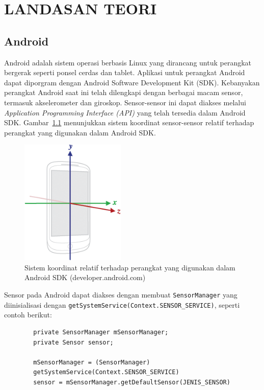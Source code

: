 \chapter{LANDASAN TEORI}

\section{Android}
Android adalah sistem operasi berbasis Linux yang dirancang untuk perangkat bergerak seperti ponsel cerdas dan tablet. Aplikasi untuk perangkat Android dapat diporgram dengan Android Software Development Kit (SDK). Kebanyakan perangkat Android saat ini telah dilengkapi dengan berbagai macam sensor, termasuk akselerometer dan giroskop. Sensor-sensor ini dapat diakses melalui \textit{Application Programming Interface (API)} yang telah tersedia dalam Android SDK\@. Gambar~\ref{gambar:koordinat-sensor-android} menunjukkan sistem koordinat sensor-sensor relatif terhadap perangkat yang digunakan dalam Android SDK\@.

\begin{figure}[h!]
    \centering
    \includegraphics[width=5cm]{gambar/landasan-teori/axis_device.png}
    \caption{Sistem koordinat relatif terhadap perangkat yang digunakan dalam Android SDK (developer.android.com)}
    \label{gambar:koordinat-sensor-android}
\end{figure}

Sensor pada Android dapat diakses dengan membuat \texttt{SensorManager} yang diinisialisasi dengan \texttt{getSystemService(Context.SENSOR_SERVICE)}, seperti contoh berikut:

\begin{listing}[h]
    \begin{verbatim}
        private SensorManager mSensorManager;
        private Sensor sensor;

        mSensorManager = (SensorManager)
        getSystemService(Context.SENSOR_SERVICE)
        sensor = mSensorManager.getDefaultSensor(JENIS_SENSOR)
    \end{verbatim}
\end{listing}


